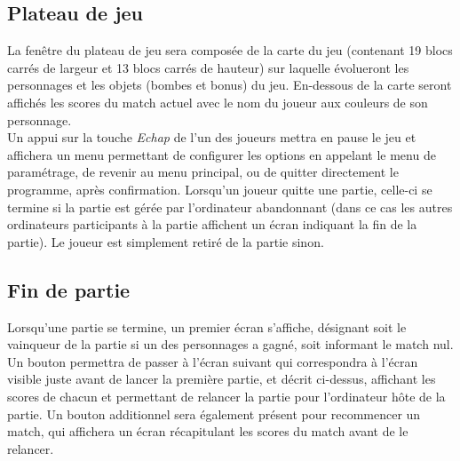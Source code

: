 \subsection{Plateau de jeu}

La fenêtre du plateau de jeu sera composée de la carte du jeu (contenant 19 blocs carrés de largeur et 13 blocs carrés de hauteur) sur laquelle évolueront les personnages et les objets (bombes et bonus) du jeu. En-dessous de la carte seront affichés les scores du match actuel avec le nom du joueur aux couleurs de son personnage.\\

Un appui sur la touche \textit{Echap} de l'un des joueurs mettra en pause le jeu et affichera un menu permettant de configurer les options en appelant le menu de paramétrage, de revenir au menu principal, ou de quitter directement le programme, après confirmation. Lorsqu'un joueur quitte une partie, celle-ci se termine si la partie est gérée par l'ordinateur abandonnant (dans ce cas les autres ordinateurs participants à la partie affichent un écran indiquant la fin de la partie). Le joueur est simplement retiré de la partie sinon.

\subsection{Fin de partie}

Lorsqu'une partie se termine, un premier écran s'affiche, désignant soit le vainqueur de la partie si un des personnages a gagné, soit informant le match nul. Un bouton permettra de passer à l'écran suivant qui correspondra à l'écran visible juste avant de lancer la première partie, et décrit ci-dessus, affichant les scores de chacun et permettant de relancer la partie pour l'ordinateur hôte de la partie. Un bouton additionnel sera également présent pour recommencer un match, qui affichera un écran récapitulant les scores du match avant de le relancer.